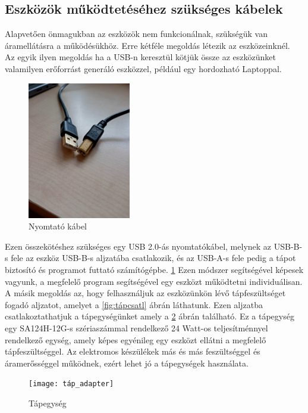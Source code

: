 \documentclass[tocnopagenum]{thesis-ekf}
\theoremstyle{definition}
\theoremstyle{remark}
\begin{document}
	\subsection{Eszközök működtetéséhez szükséges kábelek}
	\label{eszkozokmukodtetese}
	Alapvetően önmagukban az eszközök nem funkcionálnak, szükségük van áramellátásra a működésükhöz. Erre kétféle megoldás létezik az eszközeinknél. \\
	Az egyik ilyen megoldás ha a USB-n keresztül kötjük össze az eszközünket valamilyen erőforrást generáló eszközzel, például egy hordozható Laptoppal. 
	\begin{figure}[H]	
		\centering
		\includegraphics[page=1,width=0.4\textwidth]{USB}
		\caption[Nyomtató kábel]{Nyomtató kábel}
		\label{fig:USB_kabel}
	\end{figure}
	Ezen összekötéshez szükséges egy USB 2.0-ás nyomtatókábel, melynek az USB-B-s fele az eszköz USB-B-s aljzatába csatlakozik, és az USB-A-s fele pedig a tápot biztosító és programot futtató számítógépbe. 
	\ref{fig:USB_kabel}
	Ezen módszer segítségével képesek vagyunk, a megfelelő program segítségével egy eszközt működtetni individuálisan.
	\\
	A másik megoldás az, hogy felhasználjuk az eszközünkön lévő tápfeszültséget fogadó aljzatot, amelyet a \ref{fig:tápcsatl} ábrán láthatunk. Ezen aljzatba csatlakoztathatjuk a tápegységünket amely a \ref{fig:tapegyseg} ábrán található. Ez a tápegység egy SA124H-12G-s szériaszámmal rendelkező 24 Watt-os teljesítménnyel rendelkező egység, 
	amely képes egyénileg egy eszközt ellátni a megfelelő tápfeszültséggel. Az elektromos készülékek más és más feszültséggel és áramerősséggel működnek, ezért lehet jó a tápegységek használata. \cite{energom} 
	\begin{figure}[H]	
		\centering
		\texttt{[image: táp\_adapter]}
		\caption[Tápegység]{Tápegység}
		\label{fig:tapegyseg}
	\end{figure}
\end{document}
